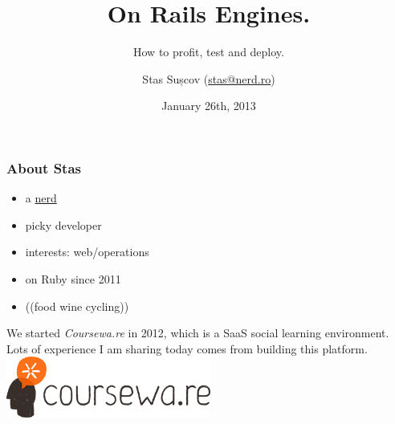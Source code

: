 \documentclass[compress]{beamer}
\title{On Rails Engines.}
\subtitle{How to profit, test and deploy.}
\author{Stas Sușcov (\href{mailto:stas@nerd.ro}{stas@nerd.ro})}
\date{January 26th, 2013}
\institute{GeekMeet \#14, Cluj-Napoca, Transylvania}
\begin{document}
\maketitle

\begin{frame}
\frametitle{About Stas}

\begin{itemize}
  \item a \href{http://stas.nerd.ro}{nerd}
  \item picky developer
  \item interests: web/operations
  \item on Ruby since 2011
  \item (\Heart (food wine cycling))
\end{itemize}
\end{frame}

\begin{frame}
  \begin{center}
    \huge We started \emph{Coursewa.re} in 2012, which is a SaaS social learning environment.
    \\
    \small Lots of experience I am sharing today comes from building this platform.
    \colorbox{solarizedBase3}{\includegraphics[height=2cm]{courseware.png}}
  \end{center}
\end{frame}
\end{document}
